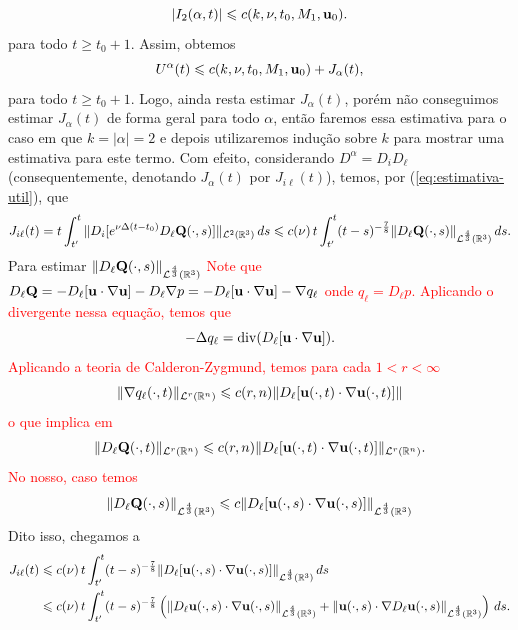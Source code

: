 \begin{prf}
\begin{equation}
        |I_2(\alpha,t)|\leqslant c(k,\nu, t_0, M_1, \mathbf{u}_0).
    \end{equation}
    para todo $t \geqslant t_0 + 1$.
    Assim, obtemos
    \begin{equation} \label{eq:4.10}
        U^\alpha(t) \leqslant c(k,\nu,t_0,M_1,\mathbf{u}_0) + J_\alpha(t),
    \end{equation}
    para todo $t \geqslant t_0 + 1$.
    Logo, ainda resta estimar $J_\alpha(t)$, porém não conseguimos estimar $J_\alpha(t)$ de forma geral para todo $\alpha$, então faremos essa estimativa para o caso em que $k =|\alpha| = 2$ e depois utilizaremos indução sobre $k$ para mostrar uma estimativa para este termo.
    Com efeito, considerando $D^\alpha = D_iD_\ell$ (consequentemente, denotando $J_\alpha(t)$ por $J_{i\ell}(t)$), temos, por (\ref{eq:estimativa-util}), que
    \[
        J_{i\ell}(t) = t\int_{t'}^t \Vert D_i [ e^{\nu \Delta (t-t_0)} D_\ell \mathbf{Q} (\cdot,s) ] \Vert_{\mathcal{L}^2(\mathbb{R}^3)} \,ds \leqslant c(\nu) \, t \int_{t'}^t (t - s)^{-\frac{7}{8}} \Vert D_\ell \mathbf{Q}(\cdot,s) \Vert_{\mathcal{L}^{\frac{4}{3}}(\mathbb{R}^3)} \,ds.
    \]
    Para estimar $\Vert D_\ell \mathbf{Q}(\cdot,s) \Vert_{\mathcal{L}^{\frac{4}{3}}(\mathbb{R}^3)}$
    \textcolor{red}{
        Note que $D_\ell\mathbf{Q} = - D_\ell [ \mathbf{u} \cdot \nabla \mathbf{u}] - D_\ell \nabla p = - D_\ell [\mathbf{u} \cdot \nabla \mathbf{u}] - \nabla q_\ell$ onde $q_\ell = D_\ell p$. Aplicando o divergente nessa equação, temos que
        \[
            -\Delta q_\ell = \mathrm{div} ( D_\ell [ \mathbf{u} \cdot \nabla \mathbf{u}]).
        \]
        Aplicando a teoria de Calderon-Zygmund, temos para cada $1 < r < \infty$
        \[
            \Vert \nabla q_\ell (\cdot,t) \Vert_{\mathcal{L}^r(\mathbb{R}^n)} \leqslant c(r,n) \Vert D_{\ell} [\mathbf{u}(\cdot,t) \cdot \nabla\mathbf{u} (\cdot,t) ] \Vert
        \]
        o que implica em
        \[
            \Vert D_\ell \mathbf{Q}(\cdot,t) \Vert_{\mathcal{L}^r(\mathbb{R}^n)} \leqslant c(r,n) \Vert D_\ell[\mathbf{u}(\cdot,t) \cdot \nabla\mathbf{u}(\cdot,t)] \Vert_{\mathcal{L}^r(\mathbb{R}^n)}.  
        \]
        No nosso, caso temos
        \[
            \Vert D_\ell\mathbf{Q}(\cdot,s) \Vert_{\mathcal{L}^\frac{4}{3}(\mathbb{R}^3)} \leqslant c \Vert D_{\ell} [\mathbf{u}(\cdot,s) \cdot \nabla \mathbf{u}(\cdot,s)] \Vert_{\mathcal{L}^{\frac{4}{3}}(\mathbb{R}^3)}
        \]
    }\!Dito isso, chegamos a
    \[
        \begin{aligned}
            J_{i\ell}(t) &\leqslant c(\nu) \, t \int_{t'}^t (t - s)^{-\frac{7}{8}} \Vert D_\ell [\bu(\cdot,s) \cdot \nabla \bu(\cdot,s)] \Vert_{\cL^\frac{4}{3}(\bR^3)} \,ds\\
            &\leqslant c(\nu) \, t \int_{t'}^t (t - s)^{-\frac{7}{8}} \left( \Vert D_{\ell} \bu(\cdot,s) \cdot \nabla \bu(\cdot,s) \Vert_{\cL^\frac{4}{3}(\bR^3)} + \Vert \bu(\cdot,s) \cdot \nabla D_\ell \bu(\cdot,s) \Vert_{\cL^\frac{4}{3}(\bR^3)} \right) \,ds. 

\end{aligned}\]
\end{prf}
